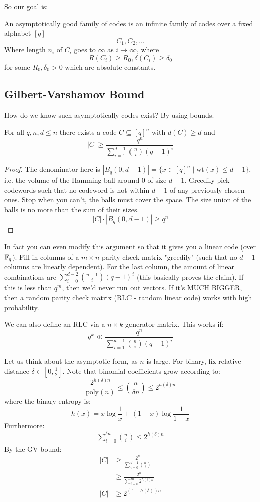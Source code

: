 So our goal is:
\begin{definition}
    An asymptotically good family of codes is an infinite family of codes over a fixed alphabet $[q]$
    \[ C_1, C_2, \dots \]
    Where length $n_i$ of $C_i$ goes to $\infty$ as $i \to \infty$, where
    \[ R(C_i) \geq R_0, \delta(C_i) \geq \delta_0 \]
    for some $R_0, \delta_0 > 0$ which are absolute constants.
\end{definition} 

\subsection{Gilbert-Varshamov Bound}
How do we know such asymptotically codes exist? By using bounds.
\begin{theorem}
    For all $q, n, d \leq n$ there exists a code $C \subseteq [q]^n$ with $d(C) \geq d$ and
    \[ |C| \geq \frac{q^n}{\sum_{i = 1}^{d - 1} \binom{n}{i} (q - 1)^i} \]
    \begin{proof}
        The denominator here is $|B_q(0, d - 1)| = \{x \in [q]^n \mid \text{wt}(x) \leq d - 1\}$,
        i.e. the volume of the Hamming ball around 0 of size $d - 1$.
        Greedily pick codewords such that no codeword is not within $d - 1$ of any previously chosen ones. Stop when you can't, the balls must cover the space. The size union of the balls is no more than the sum of their sizes.
        \[ |C| \cdot |B_q(0, d - 1)| \geq q^n \]
    \end{proof}
\end{theorem}

In fact you can even modify this argument so that it gives you a linear code (over $\operatorname{\mathbb{F}}_q$). Fill in columns of a $m \times n$ parity check matrix "greedily" (such that no $d - 1$ columns are linearly dependent). For the last column,
the amount of linear combinations are $\sum^{d - 2}_{i = 0} \binom{n - 1}{i} (q - 1)^i$ (this basically proves the claim). If this is less than $q^m$, then we'd never run out vectors. 
If it's MUCH BIGGER, then a random parity check matrix (RLC - random linear code) works with high probability.

We can also define an RLC via a $n \times k$ generator matrix. This works if:
\[ q^k \ll \frac{q^n}{\sum_{i = 1}^{d - 1} \binom{n}{i} (q - 1)^i} \]

Let us think about the asymptotic form, as $n$ is large.
For binary, fix relative distance $\delta \in [0, \frac{1}{2}]$. Note that binomial coefficients grow according to:
\[ \frac{2^{h(\delta) n}}{\text{poly}(n)} \leq \binom{n}{\delta n} \leq 2^{h(\delta) n}\]
where the binary entropy is:
\[ h(x) = x \log \frac{1}{x} + (1 - x) \log \frac{1}{1 - x} \]
Furthermore:
\begin{align*}
    \sum_{i = 0}^{\delta n} \binom{n}{i} \leq 2^{h(\delta) n}
\end{align*}
By the GV bound:
\begin{align*}
    |C| &\geq \frac{2^n}{\sum_{i = 0}^{d - 1} \binom{n}{i}} \\
    &\geq \frac{2^n}{\sum_{i = 0}^{\delta n} 2^{h(\delta) n}} \\
    |C| &\geq 2^{(1 - h(\delta))n}
\end{align*}

